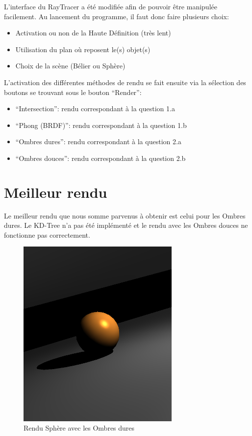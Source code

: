 \documentclass[a4paper,11pt,titlepage]{article}
\begin{document}
L'interface du RayTracer a été modifiée afin de pouvoir être manipulée facilement. Au lancement du programme, il faut donc faire plusieurs choix:
\begin{itemize}
 \item Activation ou non de la Haute Définition (très lent)
 \item Utilisation du plan où reposent le(s) objet(s)
 \item Choix de la scène (Bélier ou Sphère)\\
\end{itemize}

L'activation des différentes méthodes de rendu se fait ensuite via la sélection des boutons se trouvant sous le bouton ``Render'':
\begin{itemize}
 \item ``Intersection'': rendu correspondant à la question 1.a
 \item ``Phong (BRDF)'': rendu correspondant à la question 1.b
 \item ``Ombres dures'': rendu correspondant à la question 2.a
 \item ``Ombres douces'': rendu correspondant à la question 2.b
\end{itemize}

\section{Meilleur rendu}

Le meilleur rendu que nous somme parvenus à obtenir est celui pour les Ombres dures.
Le KD-Tree n'a pas été implémenté et le rendu avec les Ombres douces ne fonctionne pas correctement.

\begin{figure}[H]
 \begin{center}
 \includegraphics[bb=0 0 50 50,width=8cm]{Rendu/OmbresDS.png}
 \end{center}

 \caption{Rendu Sphère avec les Ombres dures}
 \label{rendu5}
\end{figure}
\end{document}
